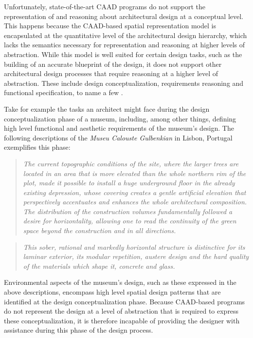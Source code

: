 \documentclass[12pt]{ucthesis}
\begin{document}
Unfortunately, state-of-the-art CAAD programs \cite{ArchiCAD} do not support the representation of and reasoning about architectural design at a conceptual level. This happens because the CAAD-based spatial representation model is encapsulated at the quantitative level of the architectural design hierarchy, which lacks the semantics necessary for representation and reasoning at higher levels of abstraction. While this model is well suited for certain design tasks, such as the building of an accurate blueprint of the design, it does not support other architectural design processes that require reasoning at a higher level of abstraction. These include design conceptualization, requirements reasoning and functional specification, to name a few \cite{bhatt-spatial-computing}. 

Take for example the tasks an architect might face during the design conceptualization phase of a museum, including, among other things, defining high level functional and aesthetic requirements of the museum's design. The following descriptions of the \emph{Museu Calouste Gulbenkian} in Lisbon, Portugal exemplifies this phase:
\begin{quote}
\emph{The current topographic conditions of the site, where the larger trees are located in an area that is more elevated than the whole northern rim of the plot, made it possible to install a huge underground floor in the already existing depression, whose covering creates a gentle artificial elevation that perspectively accentuates and enhances the whole architectural composition. The distribution of the construction volumes fundamentally followed a desire for horizontality, allowing one to read the continuity of the green space beyond the construction and in all directions.}
\end{quote}
\begin{quote}
\emph{This sober, rational and markedly horizontal structure is distinctive for its laminar exterior, its modular repetition, austere design and the hard quality of the materials which shape it, concrete and glass.}
\end{quote}
Environmental aspects of the museum's design, such as these expressed in the above descriptions, encompass high level spatial design patterns that are identified at the design conceptualization phase. Because CAAD-based programs do not represent the design at a level of abstraction that is required to express these conceptualization, it is therefore incapable of providing the designer with assistance during this phase of the design process.
\end{document}
